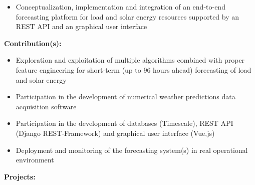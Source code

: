 \documentclass{mycv}
\begin{document}
\begin{myitemize}
		\begin{itemize}[itemsep=1px]
			\item Conceptualization, implementation and integration of an end-to-end forecasting platform for load and solar energy resources supported by an REST API and an graphical user interface
		\end{itemize}
		
		\vspace{0.2cm}
		\textbf{Contribution(s):}
		
		\begin{itemize}[itemsep=1px]
			\item Exploration and exploitation of multiple algorithms combined with proper feature engineering for short-term (up to 96 hours ahead) forecasting of load and solar energy
			\item Participation in the development of numerical weather predictions data acquisition software
			\item Participation in the development of databases (Timescale), REST API (Django REST-Framework) and graphical user interface (Vue.js)
			\item Deployment and monitoring of the forecasting system(s) in real operational environment
		\end{itemize}
	
\end{myitemize}	
	\vspace{0.6cm}	
	
\textbf{Projects:}
\vspace{0.4cm}
\end{document}
